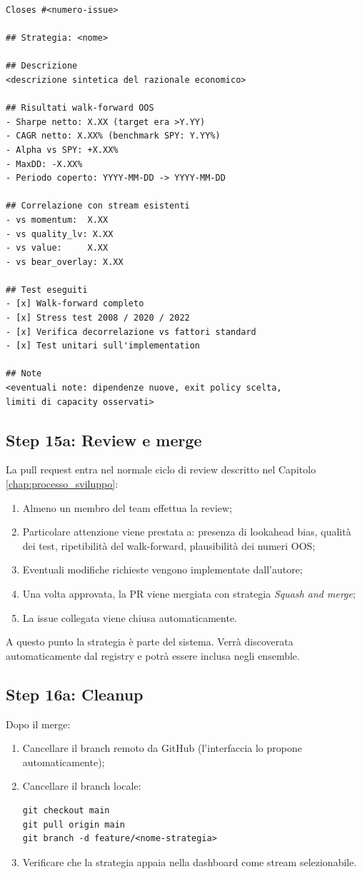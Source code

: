 \begin{lstlisting}
Closes #<numero-issue>

## Strategia: <nome>

## Descrizione
<descrizione sintetica del razionale economico>

## Risultati walk-forward OOS
- Sharpe netto: X.XX (target era >Y.YY)
- CAGR netto: X.XX% (benchmark SPY: Y.YY%)
- Alpha vs SPY: +X.XX%
- MaxDD: -X.XX%
- Periodo coperto: YYYY-MM-DD -> YYYY-MM-DD

## Correlazione con stream esistenti
- vs momentum:  X.XX
- vs quality_lv: X.XX
- vs value:     X.XX
- vs bear_overlay: X.XX

## Test eseguiti
- [x] Walk-forward completo
- [x] Stress test 2008 / 2020 / 2022
- [x] Verifica decorrelazione vs fattori standard
- [x] Test unitari sull'implementation

## Note
<eventuali note: dipendenze nuove, exit policy scelta,
limiti di capacity osservati>
\end{lstlisting}

\subsection{Step 15a: Review e merge}

La pull request entra nel normale ciclo di review descritto nel Capitolo \ref{chap:processo_sviluppo}:

\begin{enumerate}
  \item Almeno un membro del team effettua la review;
  \item Particolare attenzione viene prestata a: presenza di lookahead bias, qualità dei test, ripetibilità del walk-forward, plausibilità dei numeri OOS;
  \item Eventuali modifiche richieste vengono implementate dall'autore;
  \item Una volta approvata, la PR viene mergiata con strategia \emph{Squash and merge};
  \item La issue collegata viene chiusa automaticamente.
\end{enumerate}

A questo punto la strategia è parte del sistema. Verrà discoverata automaticamente dal registry e potrà essere inclusa negli ensemble.

\subsection{Step 16a: Cleanup}

Dopo il merge:

\begin{enumerate}
  \item Cancellare il branch remoto da GitHub (l'interfaccia lo propone automaticamente);
  \item Cancellare il branch locale:
\begin{lstlisting}
git checkout main
git pull origin main
git branch -d feature/<nome-strategia>
\end{lstlisting}
  \item Verificare che la strategia appaia nella dashboard come stream selezionabile.
\end{enumerate}
